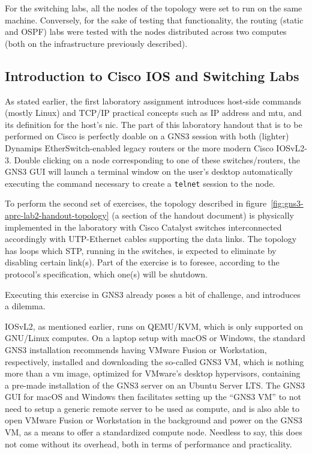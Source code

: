 For the switching labs, all the nodes of the topology were set to run on the same machine.
Conversely, for the sake of testing that functionality, the routing (static and OSPF) labs were tested with the nodes distributed across two computes (both on the infrastructure previously described).



\subsection{Introduction to Cisco IOS and Switching Labs}
\label{subsec:gns3introswitching}

As stated earlier, the first laboratory assignment introduces host-side commands (mostly Linux) and TCP/IP practical concepts such as IP address and \gls{mtu}, and its definition for the host's \gls{nic}.
The part of this laboratory handout that is to be performed on Cisco is perfectly doable on a GNS3 session with both (lighter) Dynamips EtherSwitch-enabled legacy routers or the more modern Cisco IOSvL2-3.
Double clicking on a node corresponding to one of these switches/routers, the GNS3 GUI will launch a terminal window on the user's desktop automatically executing the command necessary to create a \texttt{telnet} session to the node.

To perform the second set of exercises, the topology described in figure~\ref{fig:gns3-aprc-lab2-handout-topology} (a section of the handout document) is physically implemented in the laboratory with Cisco Catalyst switches interconnected accordingly with UTP-Ethernet cables supporting the data links.
The topology has loops which STP, running in the switches, is expected to eliminate by disabling certain link(s).
Part of the exercise is to foresee, according to the protocol's specification, which one(s) will be shutdown.

Executing this exercise in GNS3 already poses a bit of challenge, and introduces a dilemma.

IOSvL2, as mentioned earlier, runs on QEMU/KVM, which is only supported on GNU/Linux computes.
On a laptop setup with macOS or Windows, the standard GNS3 installation recommends having VMware Fusion or Workstation, respectively, installed and downloading the so-called GNS3 VM, which is nothing more than a \gls{vm} image, optimized for VMware's desktop hypervisors, containing a pre-made installation of the GNS3 server on an Ubuntu Server LTS.
The GNS3 GUI for macOS and Windows then facilitates setting up the ``GNS3 VM'' to not need to setup a generic remote server to be used as compute, and is also able to open VMware Fusion or Workstation in the background and power on the GNS3 VM, as a means to offer a standardized compute node.
Needless to say, this does not come without its overhead, both in terms of performance and practicality.

